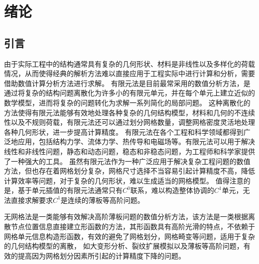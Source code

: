 \chapter{绪论}
\section{引言}
由于实际工程中的结构通常具有复杂的几何形状、材料是非线性以及多样化的荷载情况，从而使得经典的解析方法难以直接应用于工程实际中进行计算和分析，需要借助数值计算分析方法进行求解。
有限元法\textsuperscript{\cite{hughes2000,2014Computer,steinEncyclopediaComputationalMechanics2018,2013Nonlinear}}是目前最常采用的数值分析方法，是通过将复杂的结构问题离散化为许多小的有限元单元，并在每个单元上建立近似的数学模型，进而将复杂的问题转化为求解一系列简化的局部问题。
这种离散化的方法使得有限元法能够有效地处理各种复杂的几何结构模型，材料和几何的不连续性以及不规则荷载，有限元法还可以通过划分网格数量，调整网格密度灵活地处理各种几何形状，进一步提高计算精度。
有限元法在各个工程和科学领域都得到广泛地应用，包括结构力学、流体力学、热传导和电磁场等。有限元法可以用于解决线性和非线性问题，静态和动态问题，稳态和非稳态问题，为工程师和科学家提供了一种强大的工具。
虽然有限元法作为一种广泛应用于解决复杂工程问题的数值方法，但也存在着网格划分复杂，网格尺寸选择不当容易引起计算精度不高，降低计算效率等问题，对于复杂的几何形状，难以生成适当的网格模型。
值得注意的是，基于单元插值的有限元法通常只有$C^0$联系，难以构造整体协调的$C^1$单元，无法直接求解要求$C^1$是连续的薄板等高阶问题。
\par
无网格法\textsuperscript{\cite{chenMeshfreeMethodsProgress2017,belytschkoMeshlessMethodsOverview1996b}}是一类能够有效解决高阶薄板问题的数值分析方法，该方法是一类根据离散节点位置信息直接建立形函数的方法，其形函数具有高阶光滑的特点，不依赖于网格单元信息构造形函数，有效的避免了网格划分，网格畸变等问题，适用于复杂的几何结构模型的离散，
如大变形分析\textsuperscript{\cite{陈嵩涛2020几何非线性分析的高效高阶无网格法}}、裂纹扩展模拟\textsuperscript{\cite{GaoXin2018}}以及薄板等高阶问题\textsuperscript{\cite{邓立克2019薄板分析的线性基梯度光滑伽辽金无网格法}}，有效的提高因为网格划分因素所引起的计算精度下降的问题。
